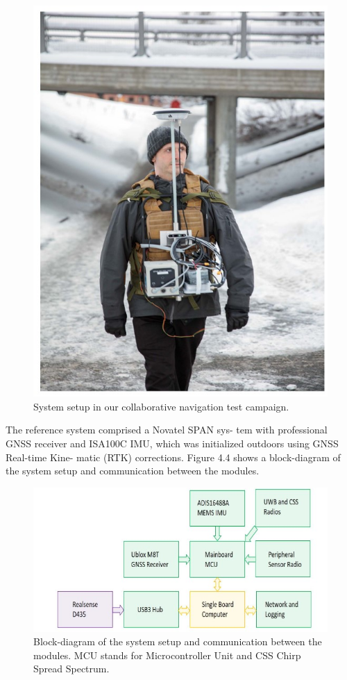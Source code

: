 \begin{figure}
    \centering
    \includegraphics{fig12.jpg}
    \caption{System setup in our collaborative navigation test campaign.}
    
\end{figure} 
The reference system comprised a Novatel SPAN sys-
tem with professional GNSS receiver and ISA100C IMU,
which was initialized outdoors using GNSS Real-time Kine-
matic (RTK) corrections. Figure 4.4 shows a block-diagram
of the system setup and communication between the modules.\\
\begin{figure}
    \centering
    \includegraphics{f9.jpg}
    \caption{Block-diagram of the system setup and communication between
the modules. MCU stands for Microcontroller Unit and CSS Chirp Spread
Spectrum.}
    
\end{figure} 
